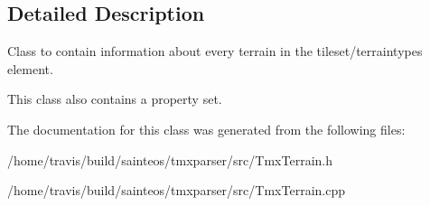 \subsection{Detailed Description}
Class to contain information about every terrain in the tileset/terraintypes element. 

This class also contains a property set. 

The documentation for this class was generated from the following files\-:\begin{DoxyCompactItemize}
\item 
/home/travis/build/sainteos/tmxparser/src/Tmx\-Terrain.\-h\item 
/home/travis/build/sainteos/tmxparser/src/Tmx\-Terrain.\-cpp\end{DoxyCompactItemize}
